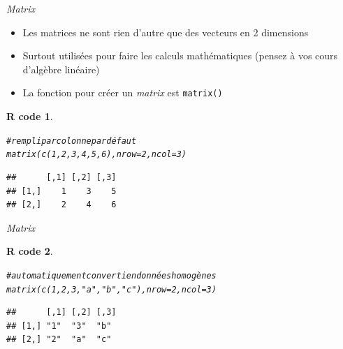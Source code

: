 \documentclass[11pt]{beamer}\usepackage[]{graphicx}\usepackage[]{color}
\makeatletter
\newcommand{\hlnum}[1]{\textcolor[rgb]{0.063,0.58,0.627}{#1}}%
\newcommand{\hlstr}[1]{\textcolor[rgb]{0.063,0.58,0.627}{#1}}%
\newcommand{\hlcom}[1]{\textcolor[rgb]{0.588,0.588,0.588}{#1}}%
\newcommand{\hlstd}[1]{\textcolor[rgb]{0.196,0.196,0.196}{#1}}%
\newcommand{\hlkwc}[1]{\textcolor[rgb]{0,0.631,0.314}{#1}}%
\newcommand{\hlkwd}[1]{\textcolor[rgb]{0.78,0.227,0.412}{#1}}%
\newenvironment{kframe}{%
 \def\at@end@of@kframe{}%
 \ifinner\ifhmode%
  \def\at@end@of@kframe{\end{minipage}}%
  \begin{minipage}{\columnwidth}%
 \fi\fi%
 \def\FrameCommand##1{\hskip\@totalleftmargin \hskip-\fboxsep
 \colorbox{shadecolor}{##1}\hskip-\fboxsep
     \hskip-\linewidth \hskip-\@totalleftmargin \hskip\columnwidth}%
 \MakeFramed {\advance\hsize-\width
   \@totalleftmargin\z@ \linewidth\hsize
   \@setminipage}}%
 {\par\unskip\endMakeFramed%
 \at@end@of@kframe}
\newenvironment{knitrout}{}{} %
\newtheorem{rcode}{R code}[section]
\newcommand{\code}[1]{\texttt{#1}}
\makeatother
\begin{document}
\begin{frame}[fragile]{\textit{Matrix}}

\begin{itemize}
  \setlength\itemsep{1em}
\item Les matrices ne sont rien d'autre que des vecteurs en 2 dimensions
\pause \item Surtout utilisées pour faire les calculs mathématiques (pensez à vos cours d'algèbre linéaire)
\pause \item La fonction pour créer un \textit{matrix} est \code{matrix()}
\end{itemize}
\pause
\begin{knitrout}
\color{fgcolor}\begin{kframe}
\begin{rcode}\label{unnamed-chunk-19}\begin{alltt}
\hlcom{# rempli par colonne par défaut}
\hlkwd{matrix}\hlstd{(}\hlkwd{c}\hlstd{(}\hlnum{1}\hlstd{,}\hlnum{2}\hlstd{,}\hlnum{3}\hlstd{,}\hlnum{4}\hlstd{,}\hlnum{5}\hlstd{,}\hlnum{6}\hlstd{),} \hlkwc{nrow} \hlstd{=} \hlnum{2}\hlstd{,} \hlkwc{ncol} \hlstd{=} \hlnum{3}\hlstd{)}
\end{alltt}
\begin{verbatim}
##      [,1] [,2] [,3]
## [1,]    1    3    5
## [2,]    2    4    6
\end{verbatim}
\end{rcode}\end{kframe}
\end{knitrout}

\end{frame}


\begin{frame}[fragile]{\textit{Matrix}}

\begin{knitrout}
\color{fgcolor}\begin{kframe}
\begin{rcode}\label{unnamed-chunk-20}\begin{alltt}
\hlcom{# automatiquement converti en données homogènes}
\hlkwd{matrix}\hlstd{(}\hlkwd{c}\hlstd{(}\hlnum{1}\hlstd{,}\hlnum{2}\hlstd{,}\hlnum{3}\hlstd{,}\hlstr{"a"}\hlstd{,}\hlstr{"b"}\hlstd{,}\hlstr{"c"}\hlstd{),} \hlkwc{nrow} \hlstd{=} \hlnum{2}\hlstd{,} \hlkwc{ncol} \hlstd{=} \hlnum{3}\hlstd{)}
\end{alltt}
\begin{verbatim}
##      [,1] [,2] [,3]
## [1,] "1"  "3"  "b" 
## [2,] "2"  "a"  "c"
\end{verbatim}
\end{rcode}\end{kframe}
\end{knitrout}

\end{frame}
\end{document}
